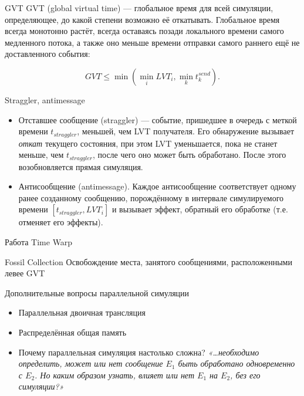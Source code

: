 \documentclass{beamer}
\begin{document}
\begin{frame}{GVT}
GVT (global virtual time) — глобальное время для всей симуляции, определяющее, до какой степени возможно её откатывать. Глобальное время всегда монотонно растёт, всегда оставаясь позади локального времени самого медленного потока, а также оно меньше времени отправки самого раннего ещё не доставленного события:

$$GVT \leq \min \left( \min\limits_{i} LVT_{i}, \min\limits_{k} t^{send}_k  \right).$$
\end{frame}

\begin{frame}{Straggler, antimessage}
\begin{itemize}
\item Отставшее сообщение (straggler) — событие, пришедшее в очередь с меткой времени $t_{straggler}$, меньшей, чем LVT получателя. Его обнаружение вызывает \textit{откат} текущего состояния, при этом LVT уменьшается, пока не станет меньше, чем $t_{straggler}$, после чего оно может быть обработано. После этого возобновляется прямая симуляция.

\item Антисообщение (antimessage). Каждое антисообщение соответствует одному ранее созданному сообщению, порождённому в интервале симулируемого времени $[t_{straggler}, LVT_i]$ и вызывает эффект, обратный его обработке (т.е. отменяет его эффекты).
\end{itemize}

\end{frame}


\begin{frame}{Работа Time Warp}
\centering
 
\end{frame}

\begin{frame}{Fossil Collection}
Освобождение места, занятого сообщениями, расположенными левее GVT
\end{frame}

\begin{frame}{Дополнительные вопросы параллельной симуляции}
\begin{itemize}
    \item Параллельная двоичная трансляция
    \item Распределённая общая память \pause
    \item Почему параллельная симуляция настолько сложна? \pause \textit{«\dots необходимо определить, может или нет сообщение $E_1$ быть обработано одновременно с $E_2$. Но каким образом узнать, влияет или нет $E_1$ на $E_2$, без его симуляции?»}
\end{itemize}    
\end{frame}
\end{document}
